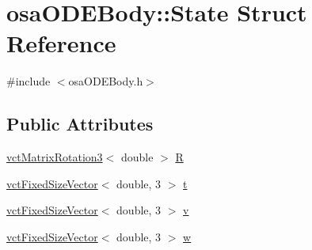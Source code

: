 \hypertarget{structosa_o_d_e_body_1_1_state}{\section{osa\-O\-D\-E\-Body\-:\-:State Struct Reference}
\label{structosa_o_d_e_body_1_1_state}
}


{\ttfamily \#include $<$osa\-O\-D\-E\-Body.\-h$>$}

\subsection*{Public Attributes}
\begin{DoxyCompactItemize}
\item 
\hyperlink{classvct_matrix_rotation3}{vct\-Matrix\-Rotation3}$<$ double $>$ \hyperlink{structosa_o_d_e_body_1_1_state_ac33054b81088a4dd9436b1418da1c92c}{R}
\item 
\hyperlink{classvct_fixed_size_vector}{vct\-Fixed\-Size\-Vector}$<$ double, 3 $>$ \hyperlink{structosa_o_d_e_body_1_1_state_a875d11546272dcb6115ab1a4d7855370}{t}
\item 
\hyperlink{classvct_fixed_size_vector}{vct\-Fixed\-Size\-Vector}$<$ double, 3 $>$ \hyperlink{structosa_o_d_e_body_1_1_state_a6158fd319c583980e491d74b490083f6}{v}
\item 
\hyperlink{classvct_fixed_size_vector}{vct\-Fixed\-Size\-Vector}$<$ double, 3 $>$ \hyperlink{structosa_o_d_e_body_1_1_state_af6b430eb6faf7e341b4647b5cd690c07}{w}
\end{DoxyCompactItemize}


